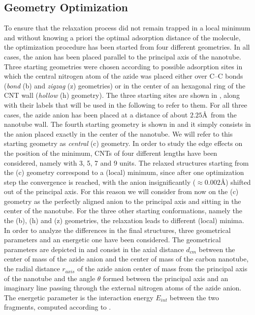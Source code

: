 \documentclass[utf8]{article}
\begin{document}
\subsection{Geometry Optimization}
To ensure that the relaxation process did not remain trapped in a local minimum and without knowing a priori the optimal adsorption distance of the \ntm molecule, the optimization procedure has been started from four different geometries.
In all cases, the anion has been placed parallel to the principal axis of the nanotube.
Three starting geometries were chosen according to possible adsorption sites in which the central nitrogen atom of the azide was placed either over C--C bonds (\textit{bond} (b) and \textit{zigzag} (z) geometries) or in the center of an hexagonal ring of the CNT wall (\textit{hollow} (h) geometry). The three starting sites are shown in , along with their labels that will be used in the following to refer to them. For all three cases, the azide anion has been placed at a distance of about $2.25$\AA\ from the nanotube wall.
The fourth starting geometry is shown in  and it simply consists in the \ntm anion placed exactly in the center of the nanotube. We will refer to this starting geometry as \textit{central} (c) geometry.
In order to study the edge effects on the position of the minimum, CNTs of four different lengths have been considered, namely with 3, 5, 7 and 9 units.
The relaxed structures starting from the (c) geometry correspond to a (local) minimum, since after one optimization step the convergence is reached, with the \ntm anion insignificantly ($\approx 0.002$\AA) shifted out of the principal axis. For this reason we will consider from now on the (c) geometry as the perfectly aligned anion to the principal axis and sitting in the center of the nanotube.
For the three other starting conformations, namely the the (b), (h) and (z) geometries, the relaxation leads to different (local) minima.
In order to analyze the differences in the final structures, three geometrical parameters and an energetic one have been considered.
The geometrical parameters are depicted in  and consist in the axial distance $d_{cm}$ between the center of mass of the azide anion and the center of mass of the carbon nanotube, the radial distance $r_{axis}$ of the azide anion center of mass from the principal axis of the nanotube and the angle $\theta$ formed between the principal axis and an imaginary line passing through the external nitrogen atoms of the azide anion.
The energetic parameter is the interaction energy $E_{int}$ between the two fragments, computed according to .\\
\end{document}

